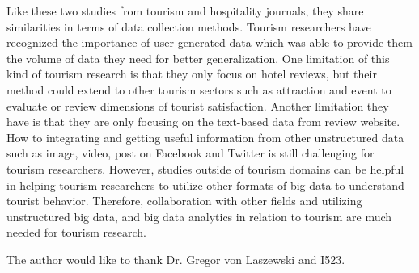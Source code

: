 \documentclass[sigconf]{acmart}
\begin{document}
Like these two studies from tourism and hospitality journals, they share similarities
in terms of data collection methods. Tourism researchers have recognized the
importance of user-generated data which was able to provide them the volume of data
they need for better generalization. One limitation of this kind of tourism research
is that they only focus on hotel reviews, but their method could extend to other
tourism sectors such as attraction and event to evaluate or review dimensions of
tourist satisfaction. Another limitation they have is that they are only focusing on
the text-based data from review website. How to integrating and getting useful
information from other unstructured data such as image, video, post on Facebook and
Twitter is still challenging for tourism researchers. However, studies outside of
tourism domains can be helpful in helping tourism researchers to utilize other formats
of big data to understand tourist behavior. Therefore, collaboration with other fields
and utilizing unstructured big data, and big data analytics in relation to tourism are
much needed for tourism research. 


\begin{acks}

  The author would like to thank Dr. Gregor von Laszewski and I523.

\end{acks}


 
\end{document}
